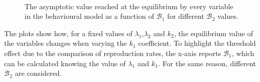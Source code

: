 \begin{figure}[ht]
	\centering
	 \quad
	 \\
	\caption[Final Behavioural variables varying $\mathcal{B}_1$]{The asymptotic value reached at the equilibrium by every variable in the behavioural model as a function of $\mathcal{B}_1$ for different $\mathcal{B}_2$ values.}
	\label{fig:subfig_sensitivity_behavioural_r1}
\end{figure}
The plots show how, for a fixed values of $\lambda_1$,$\lambda_2$ and $k_2$, the equilibrium value of the variables changes when varying the $k_1$ coefficient. To highlight the threshold effect due to the comparison of reproduction rates, the x-axis reports $\mathcal{B}_1$, which can be calculated knowing the value of  $\lambda_1$ and $k_1$. For the same reason, different $\mathcal{B}_2$ are considered. 

